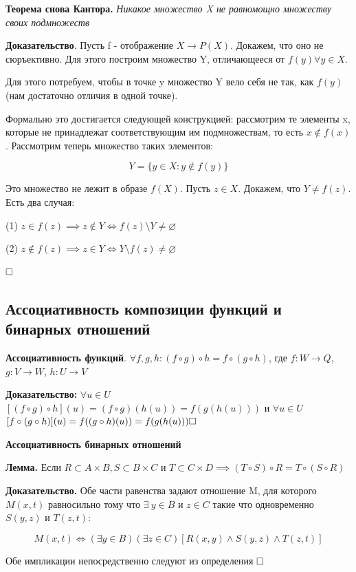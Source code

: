 \documentclass[a4paper, 10pt]{article}
\begin{document}
\textbf{Теорема снова Кантора.} \textit{Никакое множество X не равномощно множеству своих подмножеств}

\medspace

\textbf{Доказательство}. Пусть f - отображение $X \to P(X)$. Докажем, что оно не сюръективно. Для этого построим множество Y, отличающееся от $f(y) \forall y \in X$.

Для этого потребуем, чтобы в точке y множество Y вело себя не так, как $f(y)$ (нам достаточно отличия в одной точке).

Формально это достигается следующей конструкцией: рассмотрим те элементы x, которые не принадлежат соответствующим им подмножествам, то есть $x \notin f(x)$. Рассмотрим теперь множество таких элементов:

$$Y = \{y \in X \colon y \notin f(y)\}$$

Это множество не лежит в образе $f(X)$. Пусть $z \in X$. Докажем, что $Y \neq f(z)$. Есть два случая:

(1) $z \in f(z) \implies z \notin Y \Longleftrightarrow f(z) \setminus Y \neq \varnothing$

(2) $z \notin f(z) \implies z \in Y \Longleftrightarrow Y \setminus f(z) \neq \varnothing$

$\hfill \square$




\subsection{Ассоциативность композиции функций и бинарных отношений}

\textbf{Ассоциативность функций}. $\forall f, g, h: (f \circ g) \circ h = f \circ (g \circ h)$, где $f: W \to Q$, $g: V \to W$, $h: U \to V$

\medspace

\textbf{Доказательство:} $\forall u \in U$ $[(f\circ g)\circ h](u)=(f\circ g)(h(u))=f(g(h(u)))$ и $\forall u \in U$ $[f\circ (g\circ h)](u)=f ((g\circ h)(u))=f(g(h(u))) \hfill \square$

\smallskip

\textbf{Ассоциативность бинарных отношений}

\textbf{Лемма.} Если $R \subset A \times B, S \subset B \times C $ и $T \subset C \times D \implies (T \circ S) \circ R = T \circ (S \circ R)$

\medspace

\textbf{Доказательство.} Обе части равенства задают отношение M, для которого $M(x, t)$ равносильно тому что $\exists \ y \in B$ и $z \in C$ такие что одновременно $S(y, z)$ и $T(z, t)$:

$$M(x, t) \Longleftrightarrow (\exists  y \in B)(\exists  z \in C)[R(x, y) \wedge S(y, z) \wedge T(z, t)]$$

Обе импликации непосредственно следуют из определения $\hfill \square $

\begin{center}
	\Cat[25]
\end{center}
\end{document}
